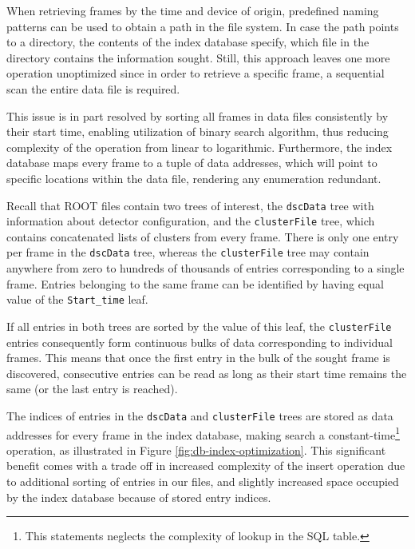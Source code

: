When retrieving frames by the time and device of origin, predefined naming patterns can be used to obtain a path in the file system. In case the path points to a directory, the contents of the index database specify, which file in the directory contains the information sought. Still, this approach leaves one more operation unoptimized since in order to retrieve a specific frame, a sequential scan the entire data file is required.

This issue is in part resolved by sorting all frames in data files consistently by their start time, enabling utilization of binary search algorithm, thus reducing complexity of the operation from linear to logarithmic. Furthermore, the index database maps every frame to a tuple of data addresses, which will point to specific locations within the data file, rendering any enumeration redundant.

Recall that ROOT files contain two trees of interest, the \texttt{dscData} tree with information about detector configuration, and the \texttt{clusterFile} tree, which contains concatenated lists of clusters from every frame. There is only one entry per frame in the \texttt{dscData} tree, whereas the \texttt{clusterFile} tree may contain anywhere from zero to hundreds of thousands of entries corresponding to a single frame. Entries belonging to the same frame can be identified by having equal value of the \texttt{Start\_time} leaf.

If all entries in both trees are sorted by the value of this leaf, the \texttt{clusterFile} entries consequently form continuous bulks of data corresponding to individual frames. This means that once the first entry in the bulk of the sought frame is discovered, consecutive entries can be read as long as their start time remains the same (or the last entry is reached).

The indices of entries in the \texttt{dscData} and \texttt{clusterFile} trees are stored as data addresses for every frame in the index database, making search a constant-time\footnote{This statements neglects the complexity of lookup in the SQL table.} operation, as illustrated in Figure \ref{fig:db-index-optimization}. This significant benefit comes with a trade off in increased complexity of the insert operation due to additional sorting of entries in our files, and slightly increased space occupied by the index database because of stored entry indices.

